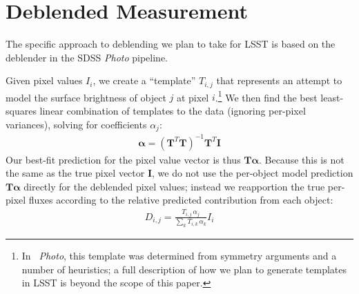 \documentclass[10pt]{article}
\begin{document}
\section{Deblended Measurement}

The specific approach to deblending we plan to take for LSST is based on
the deblender in the SDSS {\em Photo} pipeline.

Given pixel values $I_{i}$, we create a ``template'' $T_{i,j}$ that represents
an attempt to model the surface brightness of object $j$ at pixel
$i$.\footnote {
    In {\em~Photo}, this template was determined from symmetry arguments and a
    number of heuristics; a full description of how we plan to generate
    templates in LSST is beyond the scope of this paper.
}  We then find the best least-squares linear combination of templates to the
data (ignoring per-pixel variances), solving for coefficients $\alpha_{j}$:
\begin{align}
\bm{\alpha} = \left(\bm{T}^T\bm{T}\right)^{-1}\!\bm{T}^T\bm{I}
\end{align}
Our best-fit prediction for the pixel value vector is thus
$\bm{T}\bm{\alpha}$.
Because this is not the same as the true pixel vector $\bm{I}$, we do not use
the per-object model prediction $\bm{T}\bm{\alpha}$ directly for the deblended
pixel values; instead we reapportion the true per-pixel fluxes according to
the relative predicted contribution from each object:
\begin{align}
D_{i,j} = \frac{
    T_{i,j} \, \alpha_j
}{
    \sum\limits_k T_{i,k} \, \alpha_k
}
I_i
\end{align}
\end{document}
